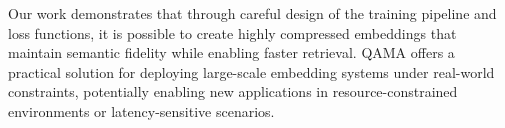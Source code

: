 Our work demonstrates that through careful design of the training pipeline and loss functions, it is possible to create highly compressed embeddings that maintain semantic fidelity while enabling faster retrieval. 
QAMA offers a practical solution for deploying large-scale embedding systems under real-world constraints, potentially enabling new applications in resource-constrained environments or latency-sensitive scenarios.